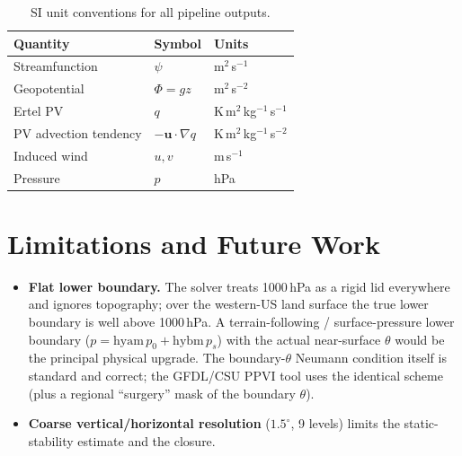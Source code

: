 \begin{table}[H]
\centering\small
\caption{SI unit conventions for all pipeline outputs.}
\label{tab:si_units}
\begin{tabular}{lll}
\toprule
Quantity & Symbol & Units \\
\midrule
Streamfunction          & $\psi$          & m$^{2}$\,s$^{-1}$ \\
Geopotential            & $\Phi = gz$     & m$^{2}$\,s$^{-2}$ \\
Ertel PV                & $q$             & K\,m$^{2}$\,kg$^{-1}$\,s$^{-1}$ \\
PV advection tendency   & $-\mathbf{u}\cdot\nabla q$ & K\,m$^{2}$\,kg$^{-1}$\,s$^{-2}$ \\
Induced wind            & $u,v$           & m\,s$^{-1}$ \\
Pressure                & $p$             & hPa \\
\bottomrule
\end{tabular}
\end{table}

\section{Limitations and Future Work}

\begin{itemize}\setlength\itemsep{2pt}
  \item \textbf{Flat lower boundary.}  The solver treats 1000\,hPa as a
        rigid lid everywhere and ignores topography; over the western-US
        land surface the true lower boundary is well above 1000\,hPa.  A
        terrain-following / surface-pressure lower boundary
        ($p=\mathrm{hyam}\,p_0+\mathrm{hybm}\,p_s$) with the actual
        near-surface $\theta$ would be the principal physical upgrade.
        The boundary-$\theta$ Neumann condition itself is standard and
        correct; the GFDL/CSU PPVI tool uses the identical scheme (plus a
        regional ``surgery'' mask of the boundary $\theta$).
  \item \textbf{Coarse vertical/horizontal resolution} ($1.5^\circ$,
        9 levels) limits the static-stability estimate and the closure.
\end{itemize}
